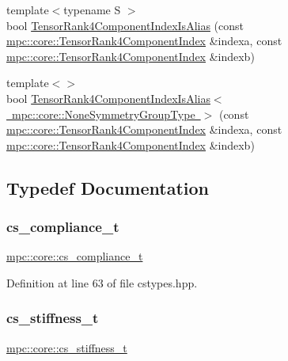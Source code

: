 \begin{DoxyCompactItemize}
\item 
{\footnotesize template$<$typename S $>$ }\\bool \mbox{\hyperlink{namespacempc_1_1core_a6a2bb811eb9c52ad922c8e96c8f0386b}{Tensor\+Rank4\+Component\+Index\+Is\+Alias}} (const \mbox{\hyperlink{namespacempc_1_1core_a54c081f41b2475abd10182bf023805d2}{mpc\+::core\+::\+Tensor\+Rank4\+Component\+Index}} \&indexa, const \mbox{\hyperlink{namespacempc_1_1core_a54c081f41b2475abd10182bf023805d2}{mpc\+::core\+::\+Tensor\+Rank4\+Component\+Index}} \&indexb)
\item 
{\footnotesize template$<$$>$ }\\bool \mbox{\hyperlink{namespacempc_1_1core_a14e25a11fab9f7ae7575404bbbbf822f}{Tensor\+Rank4\+Component\+Index\+Is\+Alias$<$ mpc\+::core\+::\+None\+Symmetry\+Group\+Type $>$}} (const \mbox{\hyperlink{namespacempc_1_1core_a54c081f41b2475abd10182bf023805d2}{mpc\+::core\+::\+Tensor\+Rank4\+Component\+Index}} \&indexa, const \mbox{\hyperlink{namespacempc_1_1core_a54c081f41b2475abd10182bf023805d2}{mpc\+::core\+::\+Tensor\+Rank4\+Component\+Index}} \&indexb)
\end{DoxyCompactItemize}


\subsection{Typedef Documentation}
\mbox{\label{namespacempc_1_1core_a33e8b8a9ae039df62c62872553ca7161}} 
\subsubsection{\texorpdfstring{cs\+\_\+compliance\+\_\+t}{cs\_compliance\_t}}
{\footnotesize\ttfamily \mbox{\hyperlink{namespacempc_1_1core_a33e8b8a9ae039df62c62872553ca7161}{mpc\+::core\+::cs\+\_\+compliance\+\_\+t}}}



Definition at line 63 of file cstypes.\+hpp.

\mbox{\label{namespacempc_1_1core_a120bef8b8e9eb17c3455661c0f51950a}} 
\subsubsection{\texorpdfstring{cs\+\_\+stiffness\+\_\+t}{cs\_stiffness\_t}}
{\footnotesize\ttfamily \mbox{\hyperlink{namespacempc_1_1core_a120bef8b8e9eb17c3455661c0f51950a}{mpc\+::core\+::cs\+\_\+stiffness\+\_\+t}}}



